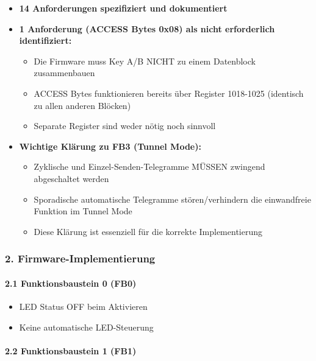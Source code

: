 \documentclass[a4paper,11pt]{article}
\providecommand{\tightlist}{\setlength{\itemsep}{0pt}\setlength{\parskip}{0pt}}
\begin{document}
\begin{itemize}
\tightlist
\item
  \textbf{14 Anforderungen spezifiziert und dokumentiert}
\item
  \textbf{1 Anforderung (ACCESS Bytes 0x08) als nicht erforderlich
  identifiziert:}

  \begin{itemize}
  \tightlist
  \item
    Die Firmware muss Key A/B NICHT zu einem Datenblock zusammenbauen
  \item
    ACCESS Bytes funktionieren bereits über Register 1018-1025
    (identisch zu allen anderen Blöcken)
  \item
    Separate Register sind weder nötig noch sinnvoll
  \end{itemize}
\item
  \textbf{Wichtige Klärung zu FB3 (Tunnel Mode):}

  \begin{itemize}
  \tightlist
  \item
    Zyklische und Einzel-Senden-Telegramme MÜSSEN zwingend abgeschaltet
    werden
  \item
    Sporadische automatische Telegramme stören/verhindern die
    einwandfreie Funktion im Tunnel Mode
  \item
    Diese Klärung ist essenziell für die korrekte Implementierung
  \end{itemize}
\end{itemize}

\hypertarget{firmware-implementierung}{%
\subsubsection{2.
Firmware-Implementierung}\label{firmware-implementierung}}

\hypertarget{funktionsbaustein-0-fb0}{%
\paragraph{2.1 Funktionsbaustein 0
(FB0)}\label{funktionsbaustein-0-fb0}}

\begin{itemize}
\tightlist
\item
  LED Status OFF beim Aktivieren
\item
  Keine automatische LED-Steuerung
\end{itemize}

\hypertarget{funktionsbaustein-1-fb1}{%
\paragraph{2.2 Funktionsbaustein 1
(FB1)}\label{funktionsbaustein-1-fb1}}
\end{document}
